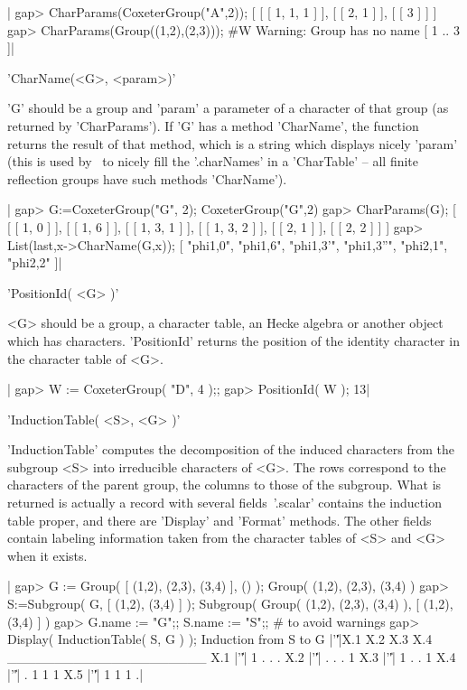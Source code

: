 |    gap> CharParams(CoxeterGroup("A",2));
    [ [ [ 1, 1, 1 ] ], [ [ 2, 1 ] ], [ [ 3 ] ] ]
    gap> CharParams(Group((1,2),(2,3)));
    #W  Warning: Group has no name
    [ 1 .. 3 ]|

%
%

'CharName(<G>, <param>)'

'G' should  be a group  and 'param' a parameter  of a character  of that
group (as returned by 'CharParams'). If 'G' has a method 'CharName', the
function returns  the result  of that  method, which  is a  string which
displays nicely  'param' (this is  used by  \CHEVIE\ to nicely  fill the
'.charNames' in a 'CharTable' --  all finite reflection groups have such
methods 'CharName').

|    gap> G:=CoxeterGroup("G", 2);
    CoxeterGroup("G",2)
    gap> CharParams(G);
    [ [ [ 1, 0 ] ], [ [ 1, 6 ] ], [ [ 1, 3, 1 ] ], [ [ 1, 3, 2 ] ],
      [ [ 2, 1 ] ], [ [ 2, 2 ] ] ]
    gap>  List(last,x->CharName(G,x));
    [ "phi{1,0}", "phi{1,6}", "phi{1,3}'", "phi{1,3}''", "phi{2,1}",
      "phi{2,2}" ]|


'PositionId( <G> )'

<G>  should be  a group,  a character  table, an  Hecke algebra  or another
object  which  has  characters.  'PositionId'  returns  the position of the
identity character in the character table of <G>.

|    gap> W := CoxeterGroup( "D", 4 );;
    gap> PositionId( W );
    13|

%

'InductionTable( <S>, <G> )'

'InductionTable'  computes the decomposition of the induced characters from
the subgroup <S> into irreducible characters of <G>. The rows correspond to
the  characters of the parent group, the  columns to those of the subgroup.
What  is returned  is actually  a record  with several  fields\:\ '.scalar'
contains  the induction table proper, and  there are 'Display' and 'Format'
methods.  The  other  fields  contain  labeling  information taken from the
character tables of <S> and <G> when it exists.

|    gap> G := Group( [ (1,2), (2,3), (3,4) ], () );
    Group( (1,2), (2,3), (3,4) )
    gap> S:=Subgroup( G, [ (1,2), (3,4) ] );
    Subgroup( Group( (1,2), (2,3), (3,4) ), [ (1,2), (3,4) ] )
    gap> G.name := "G";; S.name := "S";; # to avoid warnings
    gap> Display( InductionTable( S, G ) );
    Induction from S to G
        |'\|'|X.1 X.2 X.3 X.4
    _____________________
    X.1 |'\|'|  1   .   .   .
    X.2 |'\|'|  .   .   .   1
    X.3 |'\|'|  1   .   .   1
    X.4 |'\|'|  .   1   1   1
    X.5 |'\|'|  1   1   1   .|

